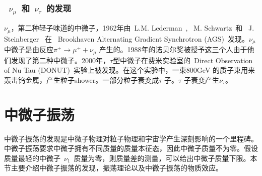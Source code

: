 \subsubsection{~$\nu_{\mu}$~和~$\nu_{\tau}$~的发现}
$\nu_{\mu}$，第二种轻子味道的中微子，1962年由~L.M. Lederman~, ~M. Schwartz~和~ J. Steinberger~ 在~ Brookhaven Alternating Gradient Synchrotron (AGS)~发现。$\nu_{\mu}$ 中微子是由反应$\pi^+ \rightarrow \mu^+ + \nu_{\mu}$ 产生的。1988年的诺贝尔奖被授予这三个人由于他们发现了第二种中微子。2000年，$\tau$型中微子在费米实验室的~Direct Observation of Nu Tau (DONUT)~实验上被发现。在这个实验中，一束800GeV 的质子束用来轰击钨金属，产生粒子shower。一部分粒子衰变成$\tau$ 子。$\tau$ 子衰变产生$\nu_{\tau}$。

\section{中微子振荡}
中微子振荡的发现是中微子物理对粒子物理和宇宙学产生深刻影响的一个里程碑。中微子振荡要求中微子拥有不同质量的质量本征态，因此中微子质量不为零。假设质量最轻的中微子~$\nu_1$~质量为零，则质量差的测量，可以给出中微子质量下限。本节主要介绍中微子振荡的发现，振荡理论以及中微子振荡的物质效应。
